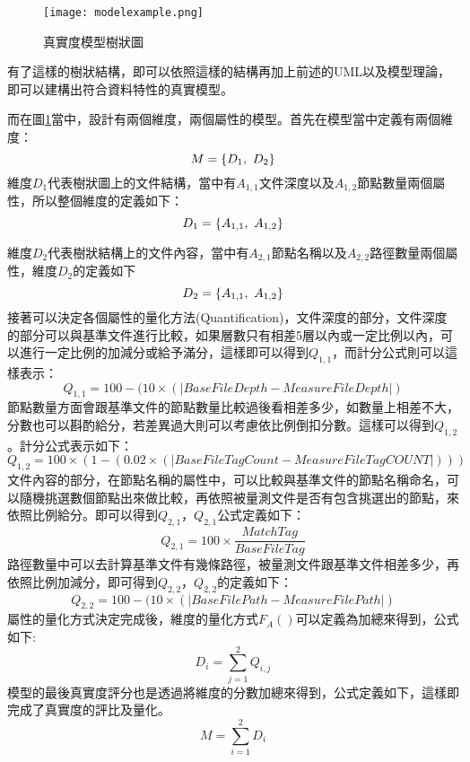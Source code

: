 \begin{figure}[H]
\centering
\graphicspath{{/Users/FUDA/Documents/masterThesis/image/}}
\texttt{[image: modelexample.png]}
\caption{真實度模型樹狀圖}
\label{modelexample}
\end{figure}

有了這樣的樹狀結構，即可以依照這樣的結構再加上前述的UML以及模型理論，即可以建構出符合資料特性的真實模型。\\\par
而在圖\ref{modelexample}當中，設計有兩個維度，兩個屬性的模型。首先在模型當中定義有兩個維度：
$$
M=\{D_1,\ D_2\}\\
$$
維度$D_1$代表樹狀圖上的文件結構，當中有$A_{1,1}$文件深度以及$A_{1,2}$節點數量兩個屬性，所以整個維度的定義如下：
$$
D_1=\{A_{1,1},\ A_{1,2}\}\\
$$

維度$D_2$代表樹狀結構上的文件內容，當中有$A_{2,1}$節點名稱以及$A_{2,2}$路徑數量兩個屬性，維度$D_2$的定義如下
$$
D_2=\{A_{1,1},\ A_{1,2}\}\\
$$
接著可以決定各個屬性的量化方法(Quantification)，文件深度的部分，文件深度的部分可以與基準文件進行比較，如果層數只有相差5層以內或一定比例以內，可以進行一定比例的加減分或給予滿分，這樣即可以得到$Q_{1,1}$，而計分公式則可以這樣表示：
$$
Q_{1,1}=100-(10\times (\left\lvert BaseFileDepth-MeasureFileDepth\right\lvert)
$$
節點數量方面會跟基準文件的節點數量比較過後看相差多少，如數量上相差不大，分數也可以斟酌給分，若差異過大則可以考慮依比例倒扣分數。這樣可以得到$Q_{1,2}$。計分公式表示如下：
$$
Q_{1,2}=100\times (1-(0.02 \times (\left\lvert BaseFileTagCount-MeasureFileTagCOUNT\right\lvert)))
$$
文件內容的部分，在節點名稱的屬性中，可以比較與基準文件的節點名稱命名，可以隨機挑選數個節點出來做比較，再依照被量測文件是否有包含挑選出的節點，來依照比例給分。即可以得到$Q_{2,1}$，$Q_{2,1}$公式定義如下：
$$
Q_{2,1}=100\times \frac{MatchTag}{BaseFileTag}
$$
路徑數量中可以去計算基準文件有幾條路徑，被量測文件跟基準文件相差多少，再依照比例加減分，即可得到$Q_{2,2}$，$Q_{2,2}$的定義如下：
$$
Q_{2,2}=100-(10\times (\left\lvert BaseFilePath-MeasureFilePath\right\lvert)
$$
屬性的量化方式決定完成後，維度的量化方式$F_A()$可以定義為加總來得到，公式如下:
$$
D_i=\sum_{j=1}^{2} Q_{i,j}
$$
模型的最後真實度評分也是透過將維度的分數加總來得到，公式定義如下，這樣即完成了真實度的評比及量化。
 $$
 M=\sum_{i=1}^{2} D_i
 $$
